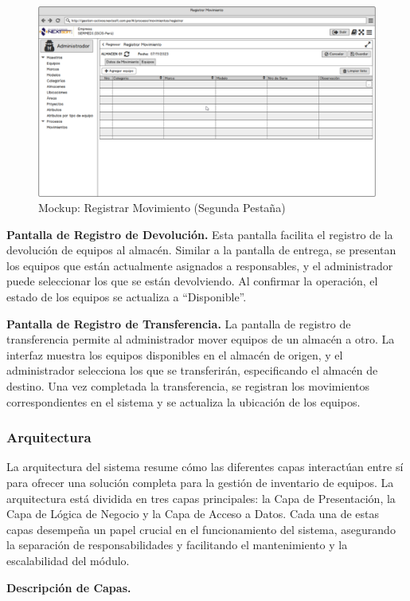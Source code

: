 \documentclass[stu, 12pt, letterpaper, donotrepeattitle, floatsintext, natbib]{apa7}
\begin{document}
\begin{figure}[H]
    \centering
    \caption{Mockup: Registrar Movimiento (Segunda Pestaña)}\label{movimiento2}
    \includegraphics[width=16.5cm, angle=0]{./images/registrarMovimiento2.png}
\end{figure}
\textbf{Pantalla de Registro de Devolución. }Esta pantalla facilita el registro de la devolución de equipos al almacén. Similar a la pantalla
de entrega, se presentan los equipos que están actualmente asignados a responsables, y el administrador puede seleccionar los que se están
devolviendo. Al confirmar la operación, el estado de los equipos se actualiza a ``Disponible''.

\textbf{Pantalla de Registro de Transferencia. }La pantalla de registro de transferencia permite al administrador mover equipos de un almacén
a otro. La interfaz muestra los equipos disponibles en el almacén de origen, y el administrador selecciona los que se transferirán,
especificando el almacén de destino. Una vez completada la transferencia, se registran los movimientos correspondientes en el sistema y se
actualiza la ubicación de los equipos.
\subsubsection{Arquitectura}
La arquitectura del sistema resume cómo las diferentes capas interactúan entre sí para ofrecer una solución completa para la gestión de
inventario de equipos. La arquitectura está dividida en tres capas principales: la Capa de Presentación, la Capa de Lógica de Negocio y la
Capa de Acceso a Datos. Cada una de estas capas desempeña un papel crucial en el funcionamiento del sistema, asegurando la separación de
responsabilidades y facilitando el mantenimiento y la escalabilidad del módulo.

\textbf{Descripción de Capas. }
\end{document}
